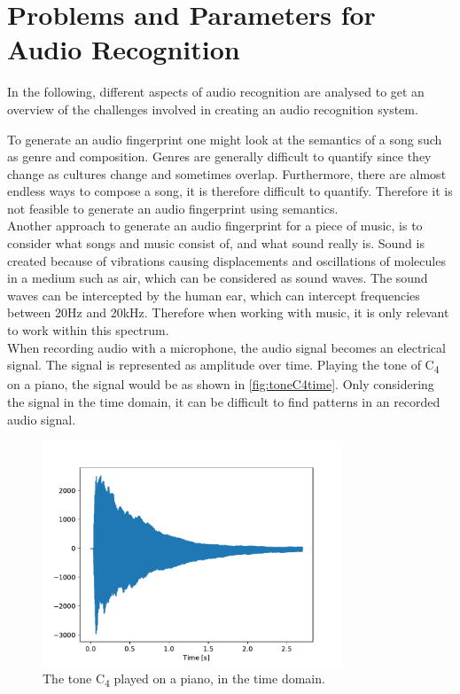 \section{Problems and Parameters for Audio Recognition}
\label{sec:ParametersAudioRecognition}
In the following, different aspects of audio recognition are analysed to get an overview of the challenges involved in creating an audio recognition system.

To generate an audio fingerprint one might look at the semantics of a song such as genre and composition. Genres are generally difficult to quantify since they change as cultures change and sometimes overlap. Furthermore, there are almost endless ways to compose a song, it is therefore difficult to quantify. Therefore it is not feasible to generate an audio fingerprint using semantics. \cite{haitsma2003highly}\\
Another approach to generate an audio fingerprint for a piece of music, is to consider what songs and music consist of, and what sound really is.
Sound is created because of vibrations causing displacements and oscillations of molecules in a medium such as air, which can be considered as sound waves. The sound waves can be intercepted by the human ear, which can intercept frequencies between 20Hz and 20kHz. Therefore when working with music, it is only relevant to work within this spectrum. \cite[21]{Meinard2015Fundamentals}\\

When recording audio with a microphone, the audio signal becomes an electrical signal. The signal is represented as amplitude over time. Playing the tone of C\textsubscript{4} on a piano, the signal would be as shown in \autoref{fig:toneC4time}. Only considering the signal in the time domain, it can be difficult to find patterns in an recorded audio signal. 

\begin{figure}[H]
    \centering
    \includegraphics[width=0.8\textwidth]{figures/C4audio.pdf}
    \caption{The tone C\textsubscript{4} played on a piano, in the time domain.}
    \label{fig:toneC4time}
\end{figure}

